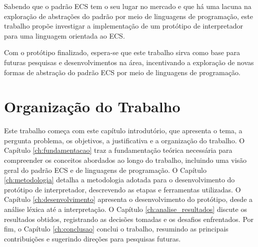 Sabendo que o padrão ECS tem o seu lugar no mercado e que há uma lacuna na exploração de abstrações do padrão por meio de linguagens de programação, este trabalho propõe investigar a implementação de um protótipo de interpretador para uma linguagem orientada ao ECS.

Com o protótipo finalizado, espera-se que este trabalho sirva como base para futuras pesquisas e desenvolvimentos na área, incentivando a exploração de novas formas de abstração do padrão ECS por meio de linguagens de programação.

\section{Organização do Trabalho} \label{sec:organizacao_trabalho}

Este trabalho começa com este capítulo introdutório, que apresenta o tema, a pergunta problema, os objetivos, a justificativa e a organização do trabalho. O Capítulo \ref{ch:fundamentacao} traz a fundamentação teórica necessária para compreender os conceitos abordados ao longo do trabalho, incluindo uma visão geral do padrão ECS e de linguagens de programação. O Capítulo \ref{ch:metodologia} detalha a metodologia adotada para o desenvolvimento do protótipo de interpretador, descrevendo as etapas e ferramentas utilizadas. O Capítulo \ref{ch:desenvolvimento} apresenta o desenvolvimento do protótipo, desde a análise léxica até a interpretação. O Capítulo \ref{ch:analise_resultados} discute os resultados obtidos, registrando as decisões tomadas e os desafios enfrentados. Por fim, o Capítulo \ref{ch:conclusao} conclui o trabalho, resumindo as principais contribuições e sugerindo direções para pesquisas futuras.
